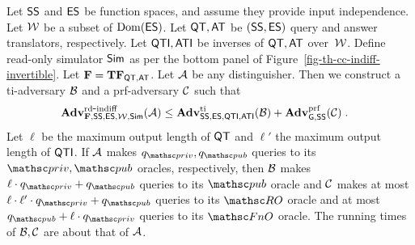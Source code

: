 \begin{theorem}\label{th-cc-indiff-invertible-gen}  Let $\mathsf{SS}$ and $\mathsf{ES}$ be function spaces, and assume they provide input independence. Let ${\cal W}$ be a subset of $\mathrm{Dom}(\mathsf{ES})$.
	Let $\mathsf{QT},\mathsf{AT}$ be $(\mathsf{SS},\mathsf{ES})$ query and answer translators, respectively. Let $\mathsf{QTI},\mathsf{ATI}$ be inverses of $\mathsf{QT},\mathsf{AT}$ over~${\cal W}$.
	Define read-only simulator $\mathsf{Sim}$ as per the bottom panel of Figure~\ref{fig-th-cc-indiff-invertible}.
	Let $\mathbf{F} = \mathbf{TF}_{\mathsf{QT},\mathsf{AT}}$. Let $\mathcal{A}$ be any distinguisher.  Then we construct a ti-adversary $\mathcal{B}$ and a prf-adversary $\mathcal{C}$ such that
	\begin{align*}
	\mathbf{Adv}^{\mathrm{rd\mbox{-}indiff}}_{\mathbf{F},\mathsf{SS},\mathsf{ES},{\cal W},\mathsf{Sim}}(\mathcal{A})  & \leq \mathbf{Adv}^{\mathrm{ti}}_{\mathsf{SS},\mathsf{ES},\mathsf{QTI},\mathsf{ATI}}(\mathcal{B}) +\mathbf{Adv}^{\mathrm{prf}}_{\mathsf{G},\mathsf{SS}}(\mathcal{C}) \;.
	\end{align*}
	Let $\ell$ be the maximum output length of $\mathsf{QT}$ and $\ell'$ the maximum output length of $\mathsf{QTI}$.
	If $\mathcal{A}$ makes $q_{\priv},q_{\pub}$ queries to its $\priv,\pub$ oracles, respectively, 
	then $\mathcal{B}$ makes $\ell\cdot q_{\priv}+q_{\pub}$ queries to its $\pub$ oracle 
	and $\mathcal{C}$ makes at most $\ell\cdot \ell'\cdot q_{\priv}+ q_{\pub}$ queries to its $\RO$ oracle 
	and at most $q_{\pub}+\ell\cdot q_{\priv}$ queries to its $\FnO$ oracle. The running times of $\mathcal{B},\mathcal{C}$ are about that of $\mathcal{A}$.
	\end{theorem}

